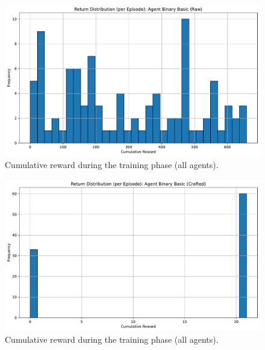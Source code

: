 \documentclass[sigconf]{acmart}
\begin{document}
\begin{figure}[t]
  \centering
  \includegraphics[width=\textwidth]{return_distribution_Binary Basic (Raw).pdf}
  \caption{Cumulative reward during the training phase (all agents).}
  \label{fig:return_distribution_Binary Basic (Raw)}
\end{figure}

\begin{figure}[t]
  \centering
  \includegraphics[width=\textwidth]{return_distribution_Binary Basic (Crafted).pdf}
  \caption{Cumulative reward during the training phase (all agents).}
  \label{fig:return_distribution_Binary Basic (Crafted)}
\end{figure}
\end{document}
